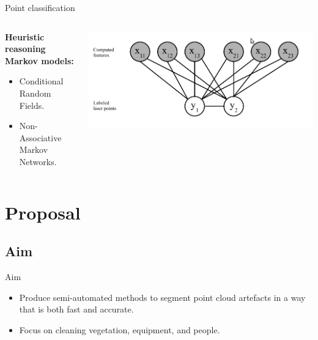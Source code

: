 \documentclass{beamer}
\begin{document}
\begin{frame}{Point classification}

\begin{columns}[T]
\begin{column}{0.5\textwidth}

\textbf{Heuristic reasoning}\\
\textbf{Markov models:}
\begin{itemize}
\item Conditional Random Fields.
\item Non-Associative Markov Networks.
\end{itemize}


\end{column}

\begin{column}{0.5\textwidth}
\includegraphics[width=1\textwidth]{pics/crf.png}


\end{column}

\end{columns}


\end{frame}

\section{Proposal}

\subsection{Aim}

\begin{frame}{Aim}
\begin{itemize}

\item
Produce semi-automated methods to segment point cloud artefacts in a way that is both fast and accurate.

\item
Focus on cleaning vegetation, equipment, and people.
\end{itemize}


\end{frame}
\end{document}
